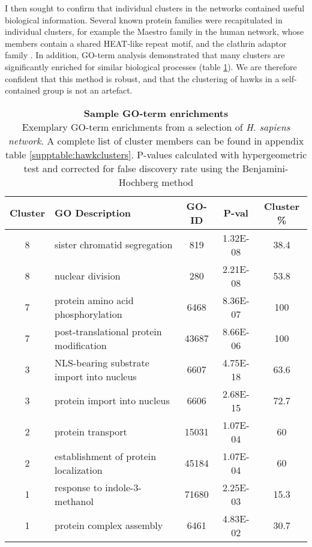 \documentclass[a4paper,11pt,twoside,openright]{scrbook}
\begin{document}
I then sought to confirm that individual clusters in the networks contained
useful biological information. Several known protein families were recapitulated
in individual clusters, for example the Maestro family in the human network,
whose members contain a shared HEAT-like repeat motif, and the clathrin adaptor
family \cite{Smith2003a, McMahon2004}. In addition, GO-term analysis
demonstrated that many clusters are significantly enriched for similar
biological processes (table \ref{table:gohawks}). We are therefore confident
that this method is robust, and that the clustering of hawks in a self-contained
group is not an artefact.

\begin{table}[h] \caption[Sample GO-term enrichments]{\sffamily \textbf{Sample
    GO-term enrichments} \\ \small Exemplary GO-term enrichments from a
    selection of \textit{H. sapiens network}. A complete list of cluster members
    can be found in appendix table \ref{supptable:hawkclusters}. P-values
    calculated with hypergeometric test and corrected for false discovery rate
    using the Benjamini-Hochberg method \cite{Benjamini1995,Maere2005}}
    \centering \onehalfspacing \begin{tabular}{c l c c c} \hline Cluster & GO
        Description & GO-ID & P-val & Cluster \%\\[0.1cm] \hline 8 & sister
        chromatid segregation & 819 & 1.32E-08 & 38.4\\ 8 & nuclear division &
        280 & 2.21E-08 & 53.8\\ 7 & protein amino acid phosphorylation & 6468 &
        8.36E-07 & 100\\ 7 & post-translational protein modification & 43687 &
        8.66E-06 & 100\\ 3 & NLS-bearing substrate import into nucleus & 6607 &
        4.75E-18 & 63.6\\ 3 & protein import into nucleus & 6606 & 2.68E-15 &
        72.7\\ 2 & protein transport & 15031 & 1.07E-04 & 60\\ 2 & establishment
        of protein localization & 45184 & 1.07E-04 & 60\\ 1 & response to
        indole-3-methanol & 71680 & 2.25E-03 & 15.3\\ 1 & protein complex
    assembly & 6461 & 4.83E-02 & 30.7\\ [0.1cm] \hline \end{tabular}
\label{table:gohawks} \end{table}
\end{document}
